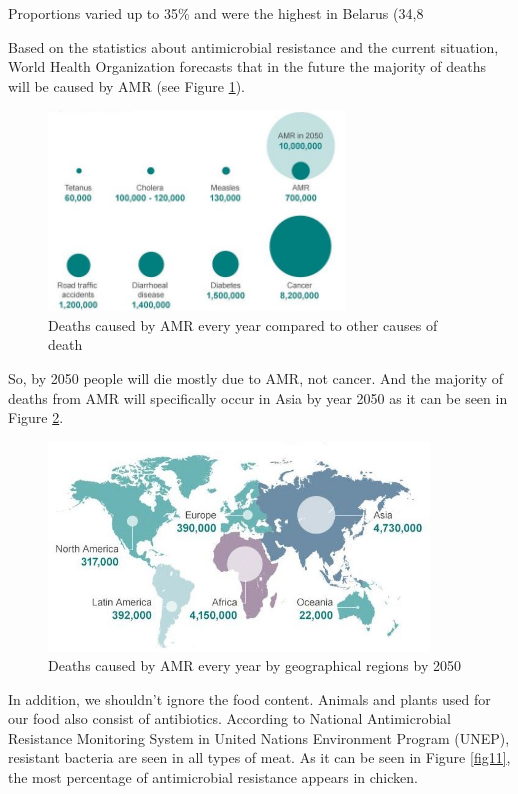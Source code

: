 Proportions varied up to 35\% and were the highest in Belarus (34,8%

Based on the statistics about antimicrobial resistance and the current situation, World Health Organization forecasts that in the future the majority of deaths will be caused by AMR (see Figure \ref{fig9}).

\begin{figure}[H]
  \centering
  \includegraphics[width=0.7\textwidth]{img/Fig9}
  \caption{Deaths caused by AMR every year compared to other causes of death}
  \label{fig9}
\end{figure}

So, by 2050 people will die mostly due to AMR, not cancer. And the majority of deaths from AMR will specifically occur in Asia by year 2050 as it can be seen in Figure \ref{fig10}.

\begin{figure}[H]
  \centering
  \includegraphics[width=0.9\textwidth]{img/Fig10}
  \caption{Deaths caused by AMR every year by geographical regions by 2050}
  \label{fig10}
\end{figure}

In addition, we shouldn’t ignore the food content. Animals and plants used for our food also consist of antibiotics. According to National Antimicrobial Resistance Monitoring System in United Nations Environment Program (UNEP), resistant bacteria are seen in all types of meat. As it can be seen in Figure \ref{fig11}, the most percentage of antimicrobial resistance appears in chicken.

